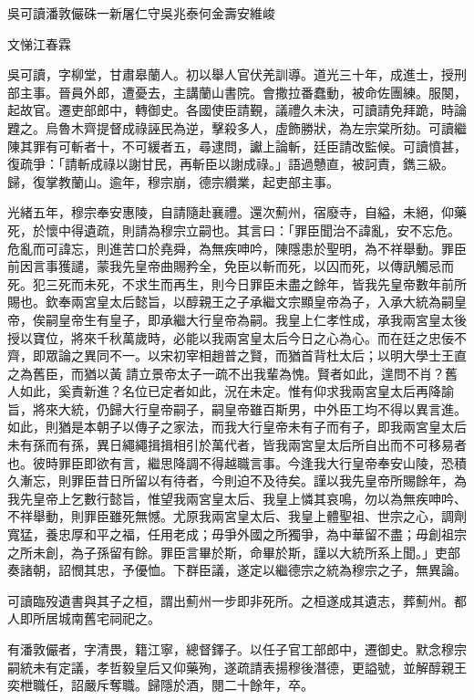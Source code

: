
\begin{pinyinscope}
吳可讀潘敦儼硃一新屠仁守吳兆泰何金壽安維峻

文悌江春霖

吳可讀，字柳堂，甘肅皋蘭人。初以舉人官伏羌訓導。道光三十年，成進士，授刑部主事。晉員外郎，遭憂去，主講蘭山書院。會撒拉番蠢動，被命佐團練。服闋，起故官。遷吏部郎中，轉御史。各國使臣請覲，議禮久未決，可讀請免拜跪，時論韙之。烏魯木齊提督成祿誣民為逆，擊殺多人，虛飾勝狀，為左宗棠所劾。可讀繼陳其罪有可斬者十，不可緩者五，尋逮問，讞上論斬，廷臣請改監候。可讀憤甚，復疏爭：「請斬成祿以謝甘民，再斬臣以謝成祿。」語過戇直，被訶責，鐫三級。歸，復掌教蘭山。逾年，穆宗崩，德宗纘業，起吏部主事。

光緒五年，穆宗奉安惠陵，自請隨赴襄禮。還次薊州，宿廢寺，自縊，未絕，仰藥死，於懷中得遺疏，則請為穆宗立嗣也。其言曰：「罪臣聞治不諱亂，安不忘危。危亂而可諱忘，則進苦口於堯舜，為無疾呻吟，陳隱患於聖明，為不祥舉動。罪臣前因言事獲譴，蒙我先皇帝曲賜矜全，免臣以斬而死，以囚而死，以傳訊觸忌而死。犯三死而未死，不求生而再生，則今日罪臣未盡之餘年，皆我先皇帝數年前所賜也。欽奉兩宮皇太后懿旨，以醇親王之子承繼文宗顯皇帝為子，入承大統為嗣皇帝，俟嗣皇帝生有皇子，即承繼大行皇帝為嗣。我皇上仁孝性成，承我兩宮皇太後授以寶位，將來千秋萬歲時，必能以我兩宮皇太后今日之心為心。而在廷之忠佞不齊，即眾論之異同不一。以宋初宰相趙普之賢，而猶首背杜太后；以明大學士王直之為舊臣，而猶以黃請立景帝太子一疏不出我輩為愧。賢者如此，遑問不肖？舊人如此，奚責新進？名位已定者如此，況在未定。惟有仰求我兩宮皇太后再降諭旨，將來大統，仍歸大行皇帝嗣子，嗣皇帝雖百斯男，中外臣工均不得以異言進。如此，則猶是本朝子以傳子之家法，而我大行皇帝未有子而有子，即我兩宮皇太后未有孫而有孫，異日繩繩揖揖相引於萬代者，皆我兩宮皇太后所自出而不可移易者也。彼時罪臣即欲有言，繼思降調不得越職言事。今逢我大行皇帝奉安山陵，恐積久漸忘，則罪臣昔日所留以有待者，今則迫不及待矣。謹以我先皇帝所賜餘年，為我先皇帝上乞數行懿旨，惟望我兩宮皇太后、我皇上憐其哀鳴，勿以為無疾呻吟、不祥舉動，則罪臣雖死無憾。尤原我兩宮皇太后、我皇上體聖祖、世宗之心，調劑寬猛，養忠厚和平之福，任用老成；毋爭外國之所獨爭，為中華留不盡；毋創祖宗之所未創，為子孫留有餘。罪臣言畢於斯，命畢於斯，謹以大統所系上聞。」吏部奏諸朝，詔憫其忠，予優恤。下群臣議，遂定以繼德宗之統為穆宗之子，無異論。

可讀臨歿遺書與其子之桓，謂出薊州一步即非死所。之桓遂成其遺志，葬薊州。都人即所居城南舊宅祠祀之。

有潘敦儼者，字清畏，籍江寧，總督鐸子。以任子官工部郎中，遷御史。默念穆宗嗣統未有定議，孝哲毅皇后又仰藥殉，遂疏請表揚穆後潛德，更謚號，並解醇親王奕枻職任，詔嚴斥奪職。歸隱於酒，閱二十餘年，卒。


\end{pinyinscope}
